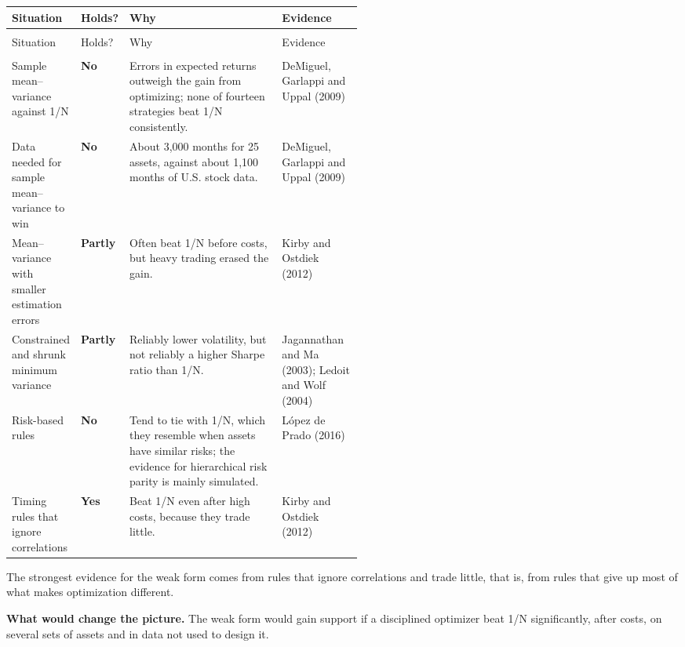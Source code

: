 {\small
\begin{longtable}{@{}>{\raggedright\arraybackslash}p{0.19\linewidth}>{\raggedright\arraybackslash}p{0.10\linewidth}>{\raggedright\arraybackslash}p{}>{\raggedright\arraybackslash}p{0.23\linewidth}@{}}
\toprule
Situation & Holds? & Why & Evidence \\
\midrule
\endfirsthead
\multicolumn{4}{@{}l}{\emph{(continued)}} \\
\toprule
Situation & Holds? & Why & Evidence \\
\midrule
\endhead
\midrule
\multicolumn{4}{r@{}}{\emph{(continued on the next page)}} \\
\endfoot
\bottomrule
\endlastfoot
Sample mean--variance against 1/N & \textbf{No} & Errors in expected returns outweigh the gain from optimizing; none of fourteen strategies beat 1/N consistently. & DeMiguel, Garlappi and Uppal (2009) \\
\addlinespace[3pt]
Data needed for sample mean--variance to win & \textbf{No} & About 3,000 months for 25 assets, against about 1,100 months of U.S. stock data. & DeMiguel, Garlappi and Uppal (2009) \\
\addlinespace[3pt]
Mean--variance with smaller estimation errors & \textbf{Partly} & Often beat 1/N before costs, but heavy trading erased the gain. & Kirby and Ostdiek (2012) \\
\addlinespace[3pt]
Constrained and shrunk minimum variance & \textbf{Partly} & Reliably lower volatility, but not reliably a higher Sharpe ratio than 1/N. & Jagannathan and Ma (2003); Ledoit and Wolf (2004) \\
\addlinespace[3pt]
Risk-based rules & \textbf{No} & Tend to tie with 1/N, which they resemble when assets have similar risks; the evidence for hierarchical risk parity is mainly simulated. & L\'opez de Prado (2016) \\
\addlinespace[3pt]
Timing rules that ignore correlations & \textbf{Yes} & Beat 1/N even after high costs, because they trade little. & Kirby and Ostdiek (2012) \\
\end{longtable}
}

The strongest evidence for the weak form comes from rules that ignore correlations and trade little, that is, from rules that give up most of what makes optimization different.

\textbf{What would change the picture.} The weak form would gain support if a disciplined optimizer beat 1/N significantly, after costs, on several sets of assets and in data not used to design it.

